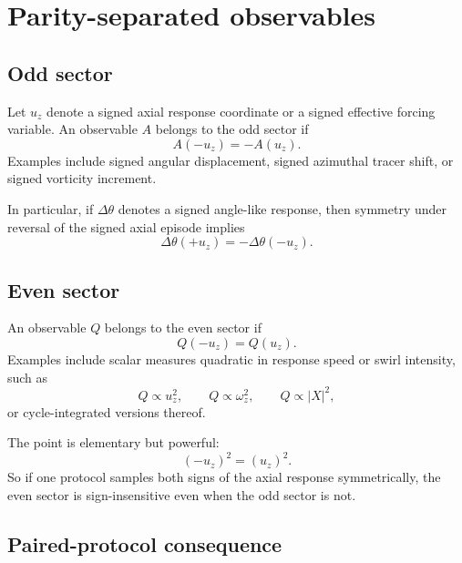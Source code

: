 \documentclass[11pt,a4paper]{article}
\begin{document}
\section{Parity-separated observables}

\subsection{Odd sector}

Let $u_z$ denote a signed axial response coordinate or a signed effective forcing variable. An observable $A$ belongs to the odd sector if
\begin{equation}
A(-u_z) = -A(u_z).
\label{eq:odd_sector}
\end{equation}
Examples include signed angular displacement, signed azimuthal tracer shift, or signed vorticity increment.

In particular, if $\Delta\theta$ denotes a signed angle-like response, then symmetry under reversal of the signed axial episode implies
\begin{equation}
\Delta\theta(+u_z) = -\Delta\theta(-u_z).
\label{eq:theta_odd}
\end{equation}

\subsection{Even sector}

An observable $Q$ belongs to the even sector if
\begin{equation}
Q(-u_z) = Q(u_z).
\label{eq:even_sector}
\end{equation}
Examples include scalar measures quadratic in response speed or swirl intensity, such as
\begin{equation}
Q \propto u_z^2,
\qquad
Q \propto \omega_z^2,
\qquad
Q \propto |X|^2,
\label{eq:Q_examples}
\end{equation}
or cycle-integrated versions thereof.

The point is elementary but powerful:
\begin{equation}
(-u_z)^2=(u_z)^2.
\label{eq:square_even}
\end{equation}
So if one protocol samples both signs of the axial response symmetrically, the even sector is sign-insensitive even when the odd sector is not.

\subsection{Paired-protocol consequence}
\end{document}
